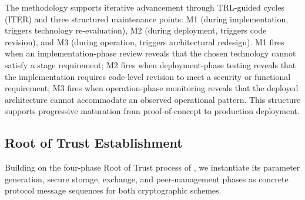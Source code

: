 \documentclass[preprint,12pt,authoryear]{elsarticle}
\begin{document}
The methodology supports iterative advancement through TRL-guided cycles (ITER) and three structured maintenance points: M1 (during implementation, triggers technology re-evaluation), M2 (during deployment, triggers code revision), and M3 (during operation, triggers architectural redesign). M1 fires when an implementation-phase review reveals that the chosen technology cannot satisfy a stage requirement; M2 fires when deployment-phase testing reveals that the implementation requires code-level revision to meet a security or functional requirement; M3 fires when operation-phase monitoring reveals that the deployed architecture cannot accommodate an observed operational pattern. This structure supports progressive maturation from proof-of-concept to production deployment.

\subsection{Root of Trust Establishment}

Building on the four-phase Root of Trust process of \citet{campos2026identity}, we instantiate its parameter generation, secure storage, exchange, and peer-management phases as concrete protocol message sequences for both cryptographic schemes.
\end{document}
